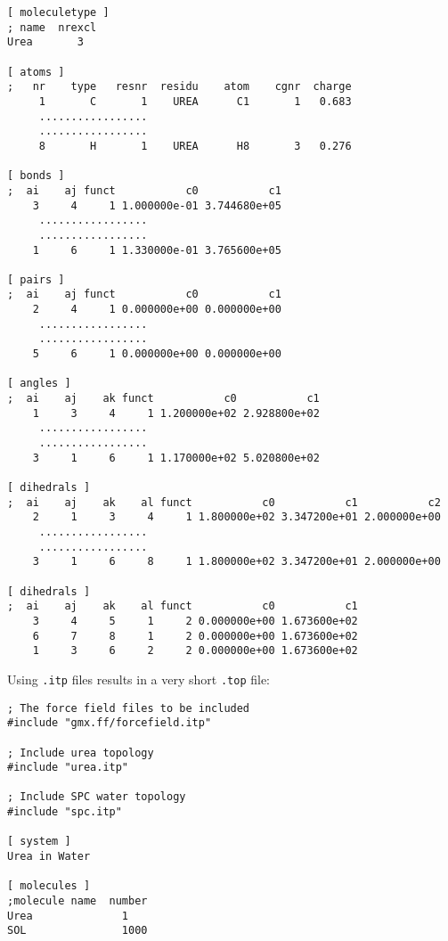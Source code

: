 {\small
\begin{verbatim}
[ moleculetype ]
; name  nrexcl
Urea       3

[ atoms ]
;   nr    type   resnr  residu    atom    cgnr  charge
     1       C       1    UREA      C1       1   0.683  
     .................
     .................
     8       H       1    UREA      H8       3   0.276

[ bonds ]
;  ai    aj funct           c0           c1
    3     4     1 1.000000e-01 3.744680e+05 
     .................
     .................
    1     6     1 1.330000e-01 3.765600e+05 

[ pairs ]
;  ai    aj funct           c0           c1
    2     4     1 0.000000e+00 0.000000e+00 
     .................
     .................
    5     6     1 0.000000e+00 0.000000e+00 

[ angles ]
;  ai    aj    ak funct           c0           c1
    1     3     4     1 1.200000e+02 2.928800e+02 
     .................
     .................
    3     1     6     1 1.170000e+02 5.020800e+02 

[ dihedrals ]
;  ai    aj    ak    al funct           c0           c1           c2
    2     1     3     4     1 1.800000e+02 3.347200e+01 2.000000e+00 
     .................
     .................
    3     1     6     8     1 1.800000e+02 3.347200e+01 2.000000e+00 

[ dihedrals ]
;  ai    aj    ak    al funct           c0           c1
    3     4     5     1     2 0.000000e+00 1.673600e+02 
    6     7     8     1     2 0.000000e+00 1.673600e+02 
    1     3     6     2     2 0.000000e+00 1.673600e+02 
\end{verbatim}}

Using {\tt *.itp} files results in a very short {\tt *.top} file:

{\small
\begin{verbatim}
; The force field files to be included
#include "gmx.ff/forcefield.itp"
        
; Include urea topology
#include "urea.itp"

; Include SPC water topology
#include "spc.itp"

[ system ]
Urea in Water

[ molecules ]
;molecule name  number
Urea              1
SOL               1000
\end{verbatim}}

